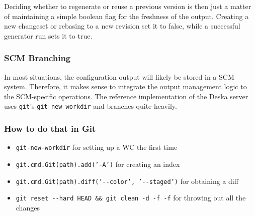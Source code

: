 \documentclass{article}
\begin{document}
Deciding whether to regenerate or reuse a previous version is then just a matter of maintaining a simple boolean flag
for the freshness of the output.  Creating a new changeset or rebasing to a new revision set it to false, while a
successful generator run sets it to true.

\subsubsection{SCM Branching}

In most situations, the configuration output will likely be stored in a SCM system.  Therefore, it makes sense to
integrate the output management logic to the SCM-specific operations.  The reference implementation of the Deska server
uses {\tt git}'s {\tt git-new-workdir} and branches quite heavily.

\subsubsection{How to do that in Git}

\begin{itemize}
    \item {\tt git-new-workdir} for setting up a WC the first time
    \item {\tt git.cmd.Git(path).add('-A')} for creating an index
    \item {\tt git.cmd.Git(path).diff('-{-}color', '-{-}staged')} for obtaining a diff
    \item {\tt git reset -{-}hard HEAD \&\& git clean -d -f -f} for throwing out all the changes
\end{itemize}
\end{document}
